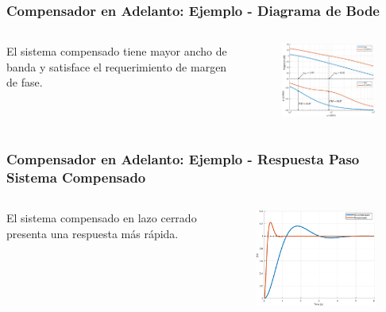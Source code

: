 \documentclass[aspectratio=169, handout]{beamer}
\theoremstyle{definition}
\theoremstyle{plain}
\theoremstyle{remark}
\begin{document}
\begin{frame}[<+->]\frametitle{Compensador en Adelanto: Ejemplo - Diagrama de Bode}
\begin{columns}
	\begin{column}{0.3\textwidth}
		El sistema compensado tiene mayor ancho de banda y satisface el requerimiento de margen de fase.
	\end{column}
	\begin{column}{0.7\textwidth}
		\begin{figure}
			\centering
			\includegraphics[width=9cm]{images/bodeLeadCompExampleComparison.eps}
		\end{figure}
	\end{column}
\end{columns}
\end{frame}

\begin{frame}[<+->]\frametitle{Compensador en Adelanto: Ejemplo - Respuesta Paso Sistema Compensado}
\begin{columns}
	\begin{column}{0.3\textwidth}
		El sistema compensado en lazo cerrado presenta una respuesta más rápida.
	\end{column}
	\begin{column}{0.7\textwidth}
		\begin{figure}
			\centering
			\includegraphics[width=9cm]{images/bodeLeadCompExampleStep.eps}
		\end{figure}
	\end{column}
\end{columns}
\end{frame}
\end{document}
